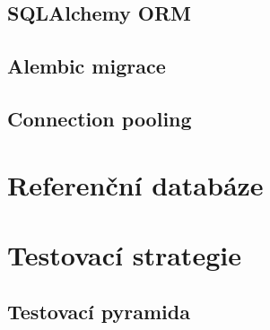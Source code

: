 \subsection{SQLAlchemy ORM}


\subsection{Alembic migrace}


\subsection{Connection pooling}


\section{Referenční databáze}
\label{sec:referencni_db}



\section{Testovací strategie}
\label{sec:testovani}


\subsection{Testovací pyramida}


